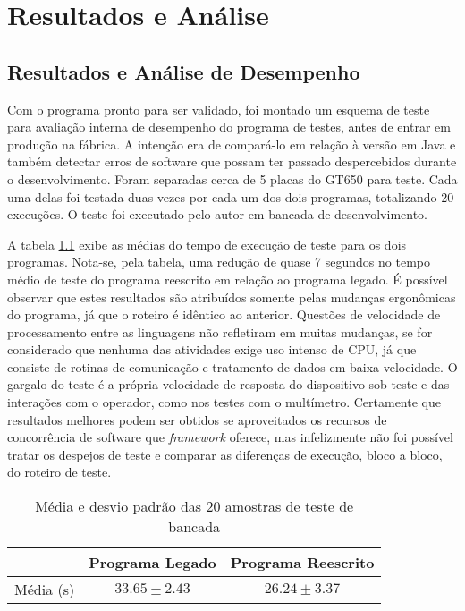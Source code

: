 \chapter{Resultados e Análise}
\label{result}    
    
\section{Resultados e Análise de Desempenho}
    
    Com o programa pronto para ser validado, foi montado um esquema de teste para avaliação interna de desempenho do programa de testes, antes de entrar em produção na fábrica. A intenção era de compará-lo em relação à versão em Java e também detectar erros de software que possam ter passado despercebidos durante o desenvolvimento. Foram separadas cerca de 5 placas do GT650 para teste. Cada uma delas foi testada duas vezes por cada um dos dois programas, totalizando 20 execuções. O teste foi executado pelo autor em bancada de desenvolvimento.
        
    A tabela \ref{tab:resultado} exibe as médias do tempo de execução de teste para os dois programas. Nota-se, pela tabela, uma redução de quase 7 segundos no tempo médio de teste do programa reescrito em relação ao programa legado. É possível observar que estes resultados são atribuídos somente pelas mudanças ergonômicas do programa, já que o roteiro é idêntico ao anterior. Questões de velocidade de processamento entre as linguagens não refletiram em muitas mudanças, se for considerado que nenhuma das atividades exige uso intenso de CPU, já que consiste de rotinas de comunicação e tratamento de dados em baixa velocidade. O gargalo do teste é a própria velocidade de resposta do dispositivo sob teste e das interações com o operador, como nos testes com o multímetro. Certamente que resultados melhores podem ser obtidos se aproveitados os recursos de concorrência de software que \textit{framework} oferece, mas infelizmente não foi possível tratar os despejos de teste e comparar as diferenças de execução, bloco a bloco, do roteiro de teste.
        
    \begin{table}[h]
        \centering
        \caption{Média e desvio padrão das 20 amostras de teste de bancada}
        \label{tab:resultado}
        \begin{tabular}{l|cc}
        
                          & Programa Legado & Programa Reescrito \\
    \hline
            Média (s)         & $33.65\pm2.43$          & $26.24\pm3.37$                          \\
        \end{tabular}
    \end{table}
    
